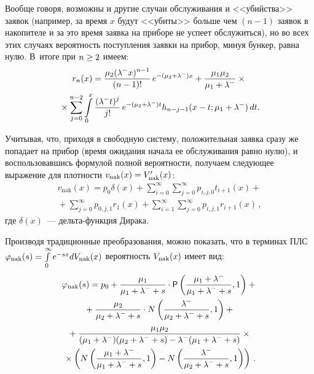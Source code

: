 \begin{multicols}{2}
Вообще говоря, возможны и другие случаи обслуживания и <<убийства>>
заявок (например, за время $x$ будут <<убиты>> больше чем $(n-1)$ заявок
в накопителе и за это время заявка на приборе не успеет обслужиться),
но во всех этих случаях вероятность поступления заявки на прибор,
минуя бункер, равна нулю. В~итоге при $n \hm\ge 2$ имеем:
\begin{multline*}
r_n(x)=\displaystyle\frac{\displaystyle \mu_2(\lambda^- x)^{n-1}\mathstrut}{\displaystyle (n-1)!\mathstrut}\, e^{-(\mu_2+\lambda^-) x}
+ \displaystyle\frac{\displaystyle  \mu_1 \mu_2\mathstrut}{\displaystyle \mu_1+\lambda^-\mathstrut}\times{}\\
{}\times
\sum\limits_{j=0}^{n-2} \int\limits_{0}^{x} \displaystyle\frac{\displaystyle (\lambda^- t)^{j}\mathstrut}{\displaystyle  j!\mathstrut}\, e^{-(\mu_2+\lambda^-) t}
h_{n-j-1}(x-t;\mu_1+\lambda^-) \,dt.
\end{multline*}

Учитывая, что, приходя в свободную систему, положительная заявка сразу же попадает
на прибор (время ожидания начала ее обслуживания равно нулю), и
воспользовавшись формулой полной вероятности, получаем следующее
выражение для плот\-ности $v_{\mathrm{nak}}(x)\hm=V'_{\mathrm{nak}}(x)$:
\begin{multline*}
v_{\mathrm{nak}}(x) = p_0 \delta(x)
+ \sum\limits_{i=0}^{\infty} \sum\limits_{j=0}^{\infty}
p_{i,j,0} t_{i+1}(x) +{}\\
{}+ \sum\limits_{j=0}^{\infty}
p_{0,j,1} r_1(x) + \sum\limits_{i=1}^{\infty}
\sum\limits_{j=0}^{\infty} p_{i,j,1} r_{i+1}(x)\,,
\end{multline*}
где $\delta(x)$~--- дель\-та-функ\-ция Дирака.

Производя традиционные преобразования,
можно показать, что в терминах ПЛС
$\varphi_{\mathrm{nak}}(s)\hm=
\int\limits_0^{\infty} e^{-sx} dV_{\mathrm{nak}}(x)$
вероятность $V_{\rm nak}(x)$ имеет вид:
\begin{multline*}
\varphi_{\mathrm{nak}}(s)
= p_0 + \displaystyle\frac{\displaystyle  \mu_1\mathstrut}{\displaystyle \mu_1+\lambda^- + s\mathstrut}
\cdot {\sf P} \left (
\displaystyle\frac{\displaystyle  \mu_1 + \lambda^-\mathstrut}{\displaystyle  \mu_1+\lambda^- + s\mathstrut},1
\right ) +{}\\
{}+
\displaystyle\frac{\displaystyle \mu_2\mathstrut}{\displaystyle \mu_2+\lambda^- + s\mathstrut}
\cdot
N \left (
\displaystyle\frac{\displaystyle  \lambda^- \mathstrut}{\displaystyle \mu_2+\lambda^- + s\mathstrut},1\right )
+{}
\\
{}+
\displaystyle\frac{\displaystyle \mu_1 \mu_2 \mathstrut}{\displaystyle (\mu_1+\lambda^-) (\mu_2+\lambda^- + s) - \lambda^- (\mu_1+\lambda^- + s)\mathstrut}
\times{}
\\
{}\times
\left ( N\left ( \displaystyle\frac{\displaystyle  \mu_1 + \lambda^- \mathstrut}{\displaystyle  \mu_1+\lambda^- + s\mathstrut},
1 \right ) - N \left ( \displaystyle\frac{\displaystyle  \lambda^- \mathstrut}{\displaystyle  \mu_2+\lambda^- + s\mathstrut},
1 \right ) \right )\,.
\end{multline*}


\end{multicols}
